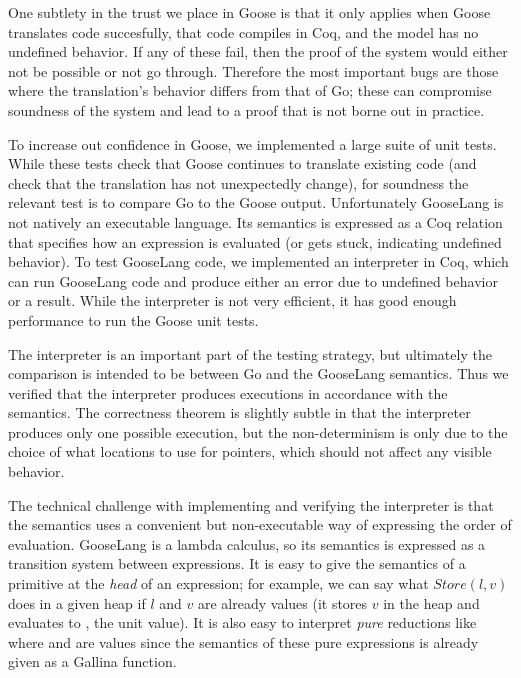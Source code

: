 One subtlety in the trust we place in Goose is that it only applies when
Goose translates code succesfully, that code compiles in Coq, and the
model has no undefined behavior. If any of these fail, then the proof of
the system would either not be possible or not go through. Therefore the
most important bugs are those where the translation's behavior differs
from that of Go; these can compromise soundness of the system and lead
to a proof that is not borne out in practice.

To increase out confidence in Goose, we implemented a large suite of
unit tests. While these tests check that Goose continues to translate
existing code (and check that the translation has not unexpectedly
change), for soundness the relevant test is to compare Go to the Goose
output. Unfortunately GooseLang is not natively an executable language.
Its semantics is expressed as a Coq relation that specifies how an
expression is evaluated (or gets stuck, indicating undefined behavior).
To test GooseLang code, we implemented an interpreter in Coq, which can
run GooseLang code and produce either an error due to undefined behavior
or a result. While the interpreter is not very efficient, it has good
enough performance to run the Goose unit tests.

The interpreter is an important part of the testing strategy, but
ultimately the comparison is intended to be between Go and the GooseLang
semantics. Thus we verified that the interpreter produces executions in
accordance with the semantics. The correctness theorem is slightly
subtle in that the interpreter produces only one possible execution, but
the non-determinism is only due to the choice of what locations to use
for pointers, which should not affect any visible behavior.

The technical challenge with implementing and verifying the interpreter
is that the semantics uses a convenient but non-executable way of
expressing the order of evaluation. GooseLang is a lambda calculus, so
its semantics is expressed as a transition system between expressions.
It is easy to give the semantics of a primitive at the \emph{head} of an
expression; for example, we can say what \(Store(l, v)\) does in a given
heap if \(l\) and \(v\) are already values (it stores \(v\) in the heap
and evaluates to \cc{\#()}, the unit value). It is also easy to
interpret \emph{pure} reductions like  where 
and  are values since the semantics of these pure expressions
is already given as a Gallina function.

